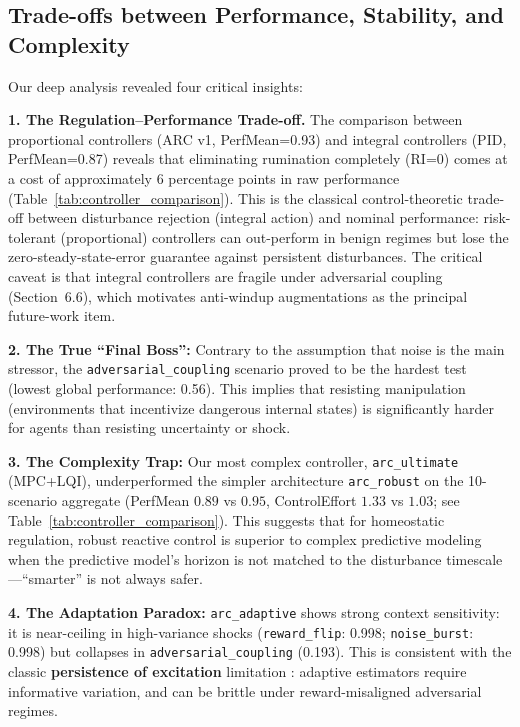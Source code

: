 \documentclass{article}
\begin{document}
\subsection{Trade-offs between Performance, Stability, and Complexity}

Our deep analysis revealed four critical insights:

\textbf{1. The Regulation--Performance Trade-off.} The comparison between proportional controllers (ARC v1, PerfMean=0.93) and integral controllers (PID, PerfMean=0.87) reveals that eliminating rumination completely (RI=0) comes at a cost of approximately 6 percentage points in raw performance (Table~\ref{tab:controller_comparison}). This is the classical control-theoretic trade-off between disturbance rejection (integral action) and nominal performance: risk-tolerant (proportional) controllers can out-perform in benign regimes but lose the zero-steady-state-error guarantee against persistent disturbances. The critical caveat is that integral controllers are fragile under adversarial coupling (Section~6.6), which motivates anti-windup augmentations as the principal future-work item.

\textbf{2. The True ``Final Boss'':} Contrary to the assumption that noise is the main stressor, the \texttt{adversarial\_coupling} scenario proved to be the hardest test (lowest global performance: 0.56). This implies that resisting manipulation (environments that incentivize dangerous internal states) is significantly harder for agents than resisting uncertainty or shock.

\textbf{3. The Complexity Trap:} Our most complex controller, \texttt{arc\_ultimate} (MPC+LQI), underperformed the simpler architecture \texttt{arc\_robust} on the 10-scenario aggregate (PerfMean $0.89$ vs $0.95$, ControlEffort $1.33$ vs $1.03$; see Table~\ref{tab:controller_comparison}). This suggests that for homeostatic regulation, robust reactive control is superior to complex predictive modeling when the predictive model's horizon is not matched to the disturbance timescale---``smarter'' is not always safer.

\textbf{4. The Adaptation Paradox:} \texttt{arc\_adaptive} shows strong context sensitivity: it is near-ceiling in high-variance shocks (\texttt{reward\_flip}: 0.998; \texttt{noise\_burst}: 0.998) but collapses in \texttt{adversarial\_coupling} (0.193). This is consistent with the classic \textbf{persistence of excitation} limitation \cite{Astrom2008}: adaptive estimators require informative variation, and can be brittle under reward-misaligned adversarial regimes.
\end{document}
